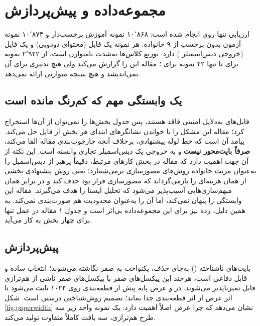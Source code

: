 \section{مجموعه‌داده و پیش‌پردازش}
\label{sec:dataset}

ارزیابی تنها روی  \cite{ronen2018big2015} انجام شده است: \num{۱۰٬۸۶۸} نمونه آموزش برچسب‌دار و \num{۱۰٬۸۷۳} نمونه آزمون بدون برچسب از ۹ خانواده. هر نمونه یک فایل  (محتوای دودویی) و یک فایل  (خروجی دیس‌اسمبلر ) دارد. توزیع کلاس‌ها به‌شدت نامتوازن است، از \num{۲٬۹۴۲} نمونه برای  تا تنها \num{۴۲} نمونه برای ؛ مقاله این را گزارش می‌کند ولی هیچ تدبیری برای آن نمی‌اندیشد و هیچ سنجه متوازنی ارائه نمی‌دهد.

\subsection{یک وابستگی مهم که کم‌رنگ مانده است}
فایل‌های  به‌دلایل امنیتی فاقد  هستند، پس جدول بخش‌ها را نمی‌توان از آن‌ها استخراج کرد؛ مقاله این مشکل را با خواندن نشانگر‌های ابتدای هر بخش از فایل  حل می‌کند. پیامد آن است که خط لوله پیشنهادی، برخلاف آنچه چارچوب‌بندی مقاله القا می‌کند، \textbf{صرفاً بایت‌محور نیست} و به خروجی یک دیس‌اسمبلر تجاری وابسته است. این نکته از آن جهت اهمیت دارد که مقاله در بخش کارهای مرتبط، دقیقاً پرهیز از دیس‌اسمبل را به‌عنوان مزیت خانواده روش‌های مصورسازی برمی‌شمارد؛ یعنی روش پیشنهادی بخشی از همان هزینه‌ای را بازمی‌گرداند که مصورسازی قرار بود حذف کند و در برابر همان مبهم‌سازی‌هایی آسیب‌پذیر می‌شود که تحلیل ایستا را هدف می‌گیرند. مقاله این وابستگی را پنهان نمی‌کند، اما آن را به‌عنوان محدودیت هم صورت‌بندی نمی‌کند. به همین دلیل، رده  نیز برای این مجموعه‌داده بی‌اثر است و جدول ۱ مقاله در عمل تنها برای چهار بخش به کار می‌آید.

\subsection{پیش‌پردازش}
بایت‌های ناشناخته () به‌جای حذف، یکنواخت به صفر نگاشته می‌شوند؛ انتخاب ساده و قابل دفاعی است، هرچند این پیکسل‌های صفر با پیکسل‌های صفر ناشی از هم‌ترازی فایل تمیزناپذیر می‌شوند. در  و  عرض پایه پیش از قطعه‌بندی روی \num{۱۰۲۴} ثابت می‌شود تا اثر عرض از اثر قطعه‌بندی جدا بماند؛ تصمیم روش‌شناختی درستی است. شکل \ref{fig:paperwidth} نشان می‌دهد که چرا عرض اصلاً اهمیت دارد: یک نمونه واحد زیر سه طرح هم‌ترازی، سه بافت کاملاً متفاوت تولید می‌کند.

